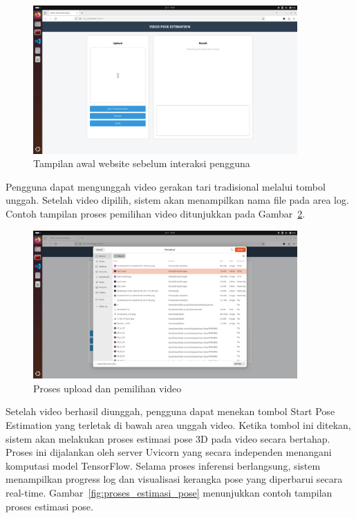 \begin{figure}[H]
    \centering
    \includegraphics[width=0.9\textwidth]{images/tampilan1.jpeg}
    \caption{Tampilan awal website sebelum interaksi pengguna}
    \label{fig:website_awal}
\end{figure}

Pengguna dapat mengunggah video gerakan tari tradisional melalui tombol unggah. Setelah video dipilih, sistem akan menampilkan nama file pada area log. Contoh tampilan proses pemilihan video ditunjukkan pada Gambar~\ref{fig:upload_video}.

\begin{figure}[H]
    \centering
    \includegraphics[width=0.9\textwidth]{images/tampilan2.jpeg}
    \caption{Proses upload dan pemilihan video}
    \label{fig:upload_video}
\end{figure}

Setelah video berhasil diunggah, pengguna dapat menekan tombol Start Pose Estimation yang terletak di bawah area unggah video. Ketika tombol ini ditekan, sistem akan melakukan proses estimasi pose 3D pada video secara bertahap. Proses ini dijalankan oleh server Uvicorn yang secara independen menangani komputasi model TensorFlow. Selama proses inferensi berlangsung, sistem menampilkan progress log dan visualisasi kerangka pose yang diperbarui secara real-time. Gambar~\ref{fig:proses_estimasi_pose} menunjukkan contoh tampilan proses estimasi pose.

